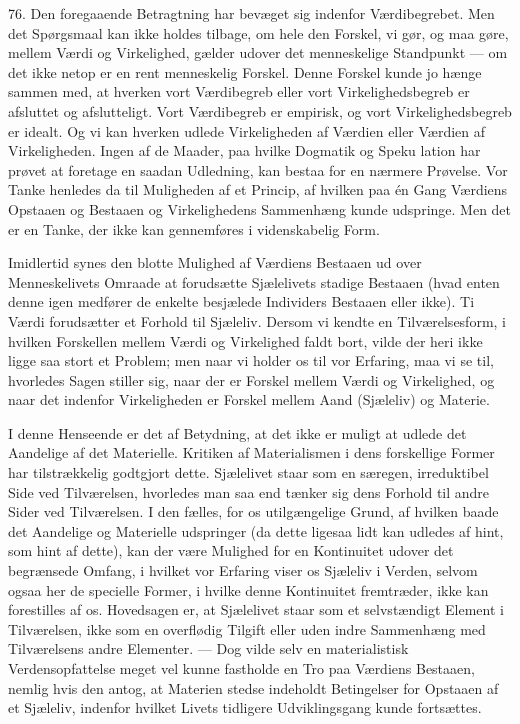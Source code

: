\documentclass[12pt,a4paper,openany]{book}
\newcommand{\opage}[1]{\marginnote{\footnotesize\textit{[#1]}}}
\begin{document}
76. Den foregaaende Betragtning har bevæget sig indenfor Værdibegrebet.
Men det Spørgsmaal kan ikke holdes tilbage, om hele den Forskel, vi gør,
og maa gøre, mellem Værdi og Virkelighed, gælder udover det menneskelige
Standpunkt --- om det ikke netop er en rent menneskelig Forskel. Denne
Forskel kunde jo hænge sammen med, at hverken vort Værdibegreb eller
vort Virkelighedsbegreb er afsluttet og afslutteligt. Vort Værdibegreb
er empirisk, og vort Virkelighedsbegreb er idealt. Og vi kan hverken
udlede Virkeligheden af Værdien eller Værdien af Virkeligheden. Ingen af
de Maader, paa hvilke Dogmatik og Speku%
\opage{177}lation har prøvet at foretage en saadan Udledning, kan bestaa
for en nærmere Prøvelse. Vor Tanke henledes da til Muligheden af et
Princip, af hvilken paa én Gang Værdiens Opstaaen og Bestaaen og
Virkelighedens Sammenhæng kunde udspringe. Men det er en Tanke, der ikke
kan gennemføres i videnskabelig Form.

Imidlertid synes den blotte Mulighed af Værdiens Bestaaen ud over
Menneskelivets Omraade at forudsætte Sjælelivets stadige Bestaaen (hvad
enten denne igen medfører de enkelte besjælede Individers Bestaaen eller
ikke). Ti Værdi forudsætter et Forhold til Sjæleliv. Dersom vi kendte en
Tilværelsesform, i hvilken Forskellen mellem Værdi og Virkelighed faldt
bort, vilde der heri ikke ligge saa stort et Problem; men naar vi holder
os til vor Erfaring, maa vi se til, hvorledes Sagen stiller sig, naar
der er Forskel mellem Værdi og Virkelighed, og naar det indenfor
Virkeligheden er Forskel mellem Aand (Sjæleliv) og Materie.

I denne Henseende er det af Betydning, at det ikke er muligt at udlede
det Aandelige af det Materielle. Kritiken af Materialismen i dens
forskellige Former har tilstrækkelig godtgjort dette. Sjælelivet staar
som en særegen, irreduktibel Side ved Tilværelsen, hvorledes man saa end
tænker sig dens Forhold til andre Sider ved Tilværelsen. I den fælles,
for os utilgængelige Grund, af hvilken baade det Aandelige og Materielle
udspringer (da dette ligesaa lidt kan udledes af hint, som hint af
dette), kan der være Mulighed for en Kontinuitet udover det begrænsede
Omfang, i hvilket vor Erfaring viser os Sjæleliv i Verden, selvom ogsaa
her de specielle Former, i hvilke denne Kontinuitet fremtræder, ikke kan
forestilles af os. Hovedsagen er, at Sjælelivet staar som et
selvstændigt Element i Tilværelsen, ikke som en overflødig Tilgift eller
uden indre Sammenhæng med Tilværelsens andre Elementer. --- Dog vilde
selv en materialistisk Verdensopfattelse meget vel kunne fastholde en
Tro paa Værdiens Bestaaen, nemlig hvis den antog, at Materien stedse
indeholdt Betingelser for Opstaaen af et Sjæleliv, indenfor hvilket
Livets tidligere Udviklingsgang kunde fortsættes.
\end{document}
